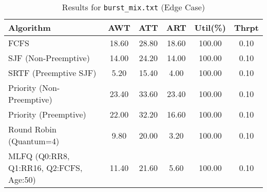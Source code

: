 \documentclass[12pt]{article}
\begin{document}
\begin{table}[htbp]
\centering
\caption{Results for \texttt{burst\_mix.txt} (Edge Case)}
\label{tab:burstmix_results}
\footnotesize
\begin{tabular}{@{}l S[table-format=3.2] S[table-format=3.2] S[table-format=3.2] S[table-format=3.2] S[table-format=1.2]@{}}
\toprule
Algorithm                                     & {AWT} & {ATT} & {ART} & {Util(\%)} & {Thrpt}\\
\midrule
FCFS                                         & 18.60         & 28.80            & 18.60          & 100.00          & 0.10 \\
SJF (Non-Preemptive)                         & 14.00         & 24.20            & 14.00          & 100.00          & 0.10 \\
SRTF (Preemptive SJF)                        & 5.20          & 15.40            & 4.00           & 100.00          & 0.10 \\
Priority (Non-Preemptive)                    & 23.40         & 33.60            & 23.40          & 100.00          & 0.10 \\
Priority (Preemptive)                        & 22.00         & 32.20            & 16.60          & 100.00          & 0.10 \\
Round Robin (Quantum=4)                      & 9.80          & 20.00            & 3.20           & 100.00          & 0.10 \\
MLFQ (Q0:RR8, Q1:RR16, Q2:FCFS, Age:50)      & 11.40         & 21.60            & 5.60           & 100.00          & 0.10 \\
\bottomrule
\end{tabular}
\end{table}
\end{document}
